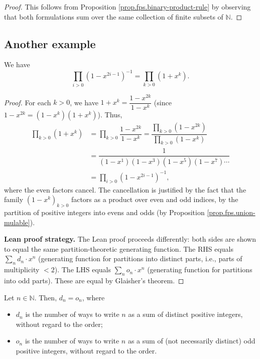 \begin{proof}
\leanok
This follows from Proposition \ref{prop.fps.binary-product-rule} by
observing that both formulations sum over the same collection of finite
subsets of $\mathbb{N}$.
\end{proof}

\subsection{Another example}

\begin{proposition}
[Euler]\label{prop.gf.prod.euler-odd}
\leantarget
\leanok
We have%
\[
\prod_{i>0}\left(  1-x^{2i-1}\right)  ^{-1}=\prod_{k>0}\left(  1+x^{k}\right)
.
\]
\end{proposition}

\begin{proof}
For each $k>0$, we have $1+x^{k}=\dfrac{1-x^{2k}}{1-x^{k}}$ (since
$1-x^{2k}=\left(  1-x^{k}\right)  \left(  1+x^{k}\right)  $). Thus,%
\begin{align*}
\prod_{k>0}\left(  1+x^{k}\right)
&  =\prod_{k>0}\dfrac{1-x^{2k}}{1-x^{k}}
=\dfrac{\prod_{k>0}\left(  1-x^{2k}\right)  }{\prod_{k>0}\left(
1-x^{k}\right)  }\\
&  =\dfrac{1}{\left(  1-x^{1}\right)  \left(  1-x^{3}\right)  \left(
1-x^{5}\right)  \left(  1-x^{7}\right)  \cdots}\\
&  =\prod_{i>0}\left(  1-x^{2i-1}\right)^{-1},
\end{align*}
where the even factors cancel. The cancellation is justified by the fact that
the family $\left(  1-x^{k}\right)  _{k>0}$ factors as a product over even and odd indices,
by the partition of positive integers into evens and odds
(by Proposition \ref{prop.fps.union-mulable}).

\textbf{Lean proof strategy.}
The Lean proof proceeds differently: both sides are shown to equal the same
partition-theoretic generating function.
The RHS equals $\sum_n d_n \cdot x^n$
(generating function for partitions into distinct parts, i.e., parts of multiplicity $<2$).
The LHS equals $\sum_n o_n \cdot x^n$
(generating function for partitions into odd parts).
These are equal by Glaisher's theorem.
\end{proof}

\begin{theorem}
[Euler]\label{thm.gf.prod.euler-comb}
\leantarget
\leanok
Let $n\in\mathbb{N}$. Then, $d_{n}=o_{n}%
$, where

\begin{itemize}
\item $d_{n}$ is the number of ways to write $n$ as a sum of distinct positive
integers, without regard to the order;

\item $o_{n}$ is the number of ways to write $n$ as a sum of (not necessarily
distinct) odd positive integers, without regard to the order.
\end{itemize}
\end{theorem}

